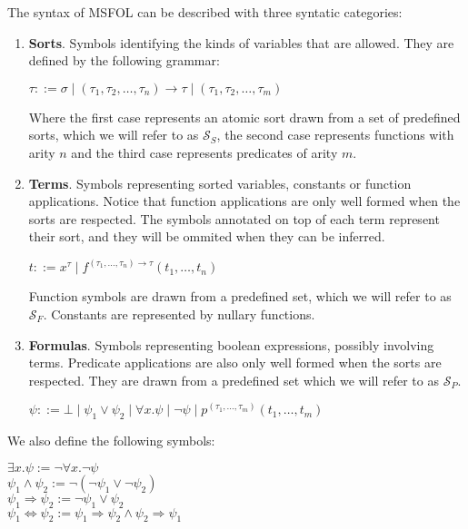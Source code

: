 The syntax of MSFOL can be described with three syntatic categories:

\begin{enumerate}
  \item \textbf{Sorts}. Symbols identifying the kinds of variables that are allowed. They are defined by the following grammar:
        \begin{center}
          $ \tau ::= \sigma \mid (\tau_{1}, \tau_{2}, \ldots, \tau_{n}) \rightarrow \tau \mid (\tau_{1}, \tau_{2}, \ldots, \tau_{m})$
        \end{center}
        Where the first case represents an atomic sort drawn from a set of predefined sorts, which we will refer to as $\mathcal{S}_{S}$, the second case represents functions with arity $n$ and the third case represents predicates of arity $m$.
  \item \textbf{Terms}. Symbols representing sorted variables, constants or function applications. Notice that function applications are only well formed when the sorts are respected. The symbols annotated on top of each term represent their sort, and they will be ommited when they can be inferred.
        \begin{center}
          $ t ::= x^{\tau} \mid f^{(\tau_{1}, \ldots, \tau_{n}) \rightarrow \tau}(t_{1}, \dots, t_{n}) $
        \end{center}
        Function symbols are drawn from a predefined set, which we will refer to as $\mathcal{S}_{F}$. Constants are represented by nullary functions.
  \item \textbf{Formulas}. Symbols representing boolean expressions, possibly involving terms. Predicate applications are also only well formed when the sorts are respected. They are drawn from a predefined set which we will refer to as $\mathcal{S}_{P}$.
        \begin{center}
          $ \psi ::= \bot \mid \psi_{1} \vee \psi_{2} \mid \forall x.\psi \mid \neg \psi \mid p^{(\tau_{1}, \ldots, \tau_{m})}(t_{1}, \dots, t_{m}) $ %
        \end{center}
\end{enumerate}

We also define the following symbols:

\begin{center}
  $\exists x. \psi := \neg \forall x. \neg \psi$\\
  $\psi_{1} \wedge \psi_{2} := \neg (\neg \psi_{1} \vee \neg \psi_{2})$\\
  $\psi_{1} \Rightarrow \psi_{2} := \neg \psi_{1} \vee \psi_{2}$\\
  $\psi_{1} \Leftrightarrow \psi_{2} := \psi_{1} \Rightarrow \psi_{2} \wedge \psi_{2} \Rightarrow \psi_{1}$
\end{center}

